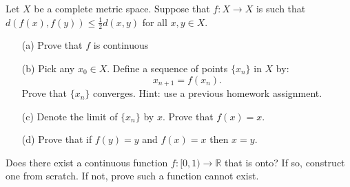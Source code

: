  \begin{exercise}
    Let $X$ be a complete metric space. Suppose that $f : X \to X$ is such that $d(f(x), f(y)) \leq \frac{1}{2}d(x, y)$ for all $x, y \in X$.
    \begin{enumerate}
      \item[(a)] Prove that $f$ is continuous
      
      \item[(b)] Pick any $x_0 \in X$. Define a sequence of points $\{x_n\}$ in $X$ by:
        \begin{equation}
          x_{n+1} = f(x_n).
        \end{equation}
        Prove that $\{x_n\}$ converges. Hint: use a previous homework assignment.
      
      \item[(c)] Denote the limit of $\{x_n\}$ by $x$. Prove that $f(x) = x$.
      
      \item[(d)] Prove that if $f(y) = y$ and $f(x) = x$ then $x = y$.
    \end{enumerate}
  \end{exercise}
  \begin{solution}

  \end{solution}

  \begin{exercise}
    Does there exist a continuous function $f : [0, 1) \to \mathbb{R}$ that is onto? If so, construct one from scratch. If not, prove such a function cannot exist.
  \end{exercise}
  \begin{solution}

  \end{solution}

